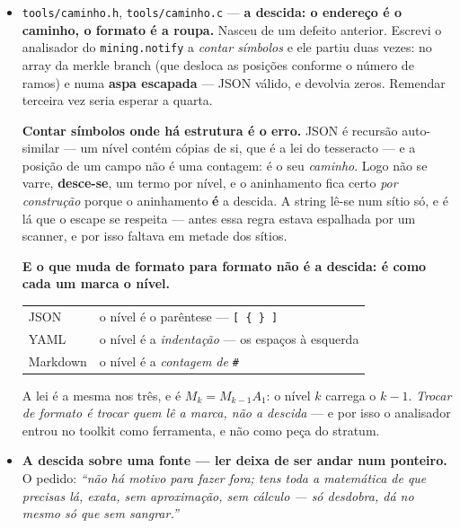 \documentclass[11pt]{article}
\newcommand{\code}[1]{\texttt{\small #1}}
\theoremstyle{plain}
\theoremstyle{remark}
\begin{document}
\begin{itemize}
Um erro de leitura que valeu a pena: o primeiro analisador de \code{mining.notify} contava as
\emph{strings entre aspas} e passava o teste --- mas a merkle branch é um \emph{array} no meio dos
parâmetros e desloca as posições conforme o número de ramos (com \code{[]} desloca $1$, com dois
ramos desloca $3$). Ele acertaria hoje e falharia no bloco seguinte. Conta-se por \textbf{nível de
aninhamento}, e a prova é a mesma linha com a branch cheia.

\item \code{tools/caminho.h}, \code{tools/caminho.c} --- \textbf{a descida: o endereço é o
caminho, o formato é a roupa.} Nasceu de um defeito anterior. Escrevi o analisador do
\code{mining.notify} a \emph{contar símbolos} e ele partiu duas vezes: no array da merkle branch
(que desloca as posições conforme o número de ramos) e numa \textbf{aspa escapada} --- JSON
válido, e devolvia zeros. Remendar terceira vez seria esperar a quarta.

\textbf{Contar símbolos onde há estrutura é o erro.} JSON é recursão auto-similar --- um nível
contém cópias de si, que é a lei do tesseracto --- e a posição de um campo não é uma contagem: é o
seu \emph{caminho}. Logo não se varre, \textbf{desce-se}, um termo por nível, e o aninhamento fica
certo \emph{por construção} porque o aninhamento \textbf{é} a descida. A string lê-se num sítio
só, e é lá que o escape se respeita --- antes essa regra estava espalhada por um scanner, e por
isso faltava em metade dos sítios.

\textbf{E o que muda de formato para formato não é a descida: é como cada um marca o nível.}

\begin{center}\begin{tabular}{@{}ll@{}}
JSON & o nível é o parêntese --- \code{[ \{ \} ]}\\
YAML & o nível é a \emph{indentação} --- os espaços à esquerda\\
Markdown & o nível é a \emph{contagem de} \code{\#}\\
\end{tabular}\end{center}

A lei é a mesma nos três, e é $M_k = M_{k-1}A_1$: o nível $k$ carrega o $k-1$. \emph{Trocar de
formato é trocar quem lê a marca, não a descida} --- e por isso o analisador entrou no toolkit
como ferramenta, e não como peça do stratum.

\item \textbf{A descida sobre uma fonte --- ler deixa de ser andar num ponteiro.} O pedido: \emph{``não há motivo para fazer fora; tens toda a matemática de que precisas lá, exata, sem
aproximação, sem cálculo --- só desdobra, dá no mesmo só que sem sangrar.''}


\end{itemize}
\end{document}
